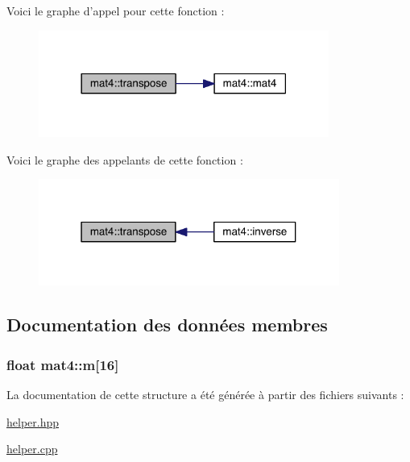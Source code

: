 Voici le graphe d'appel pour cette fonction \+:
\nopagebreak
\begin{figure}[H]
\begin{center}
\leavevmode
\includegraphics[width=270pt]{structmat4_aab816366c2233c95eac70b2eab11e8e2_cgraph}
\end{center}
\end{figure}




Voici le graphe des appelants de cette fonction \+:
\nopagebreak
\begin{figure}[H]
\begin{center}
\leavevmode
\includegraphics[width=280pt]{structmat4_aab816366c2233c95eac70b2eab11e8e2_icgraph}
\end{center}
\end{figure}




\subsection{Documentation des données membres}
\hypertarget{structmat4_ab424bc8677a83f16bd30f4eaaecb6d3a}{
\subsubsection[{m}]{\setlength{\rightskip}{0pt plus 5cm}float mat4\+::m\mbox{[}16\mbox{]}}}\label{structmat4_ab424bc8677a83f16bd30f4eaaecb6d3a}


La documentation de cette structure a été générée à partir des fichiers suivants \+:\begin{DoxyCompactItemize}
\item 
\hyperlink{helper_8hpp}{helper.\+hpp}\item 
\hyperlink{helper_8cpp}{helper.\+cpp}\end{DoxyCompactItemize}
